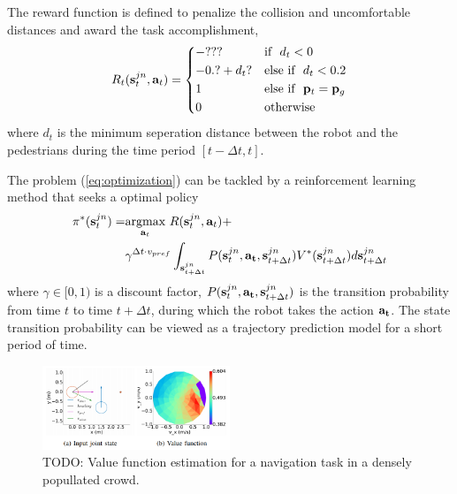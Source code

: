 \documentclass[letterpaper, 10 pt, conference]{ieeeconf}  %
\begin{document}
The reward function is defined to penalize the collision and uncomfortable distances and award the task accomplishment, 
\begin{equation}
    R_t(\bold{s}_t^{jn},\bold{a}_t)= 
\begin{dcases}
    -??? & \text{if} ~~ d_t < 0 \\
    -0.? + d_t? & \text{else if} ~~ d_t < 0.2 \\
    1 & \text{else if} ~~ \bold{p}_t=\bold{p}_g \\
    0 & \text{otherwise} 
\end{dcases}
\end{equation}
where $d_t$ is the minimum seperation distance between the robot and the pedestrians during the time period $[t-\Delta t,t]$. 

The problem (\ref{eq:optimization}) can be tackled by a reinforcement learning method that seeks a optimal policy 
\begin{equation} \label{eq:RL}
\begin{split}
\pi^{*}(\bold{s}_t^{jn}) = & \underset{\bold{a}_t}{\text{argmax}} ~ R(\bold{s}_t^{jn},\bold{a}_t) + \\
& \gamma^{\Delta t \cdot v_{pref}} \int_{\bold{s}_{t+\Delta t}^{jn}} P(\bold{s}_t^{jn},\bold{a_t},\bold{s}_{t+\Delta t}^{jn}) V^*(\bold{s}_{t+\Delta t}^{jn}) d\bold{s}_{t+\Delta t}^{jn}
\end{split}
\end{equation}
where $\gamma \in [0,1)$ is a discount factor, $P(\bold{s}_t^{jn},\bold{a_t},\bold{s}_{t+\Delta t}^{jn}) $ is the transition probability from time $t$ to time $t+\Delta t$, during which the robot takes the action $\bold{a_t}$. The state transition probability can be viewed as a trajectory prediction model for a short period of time. 

\begin{figure} [t]
  \captionsetup{font=small}
  \includegraphics[width=0.5\textwidth]{figures/vf} 
  \caption{TODO: Value function estimation for a navigation task in a densely popullated crowd.}
  \label{fig:overview}
\end{figure}
\end{document}
